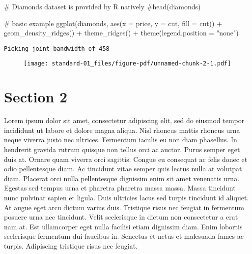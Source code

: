\documentclass[
  letterpaper,
  DIV=11,
  numbers=noendperiod,
  oneside]{scrreprt}
\newenvironment{Shaded}{\begin{snugshade}}{\end{snugshade}}
\newcommand{\AttributeTok}[1]{\textcolor[rgb]{0.40,0.45,0.13}{#1}}
\newcommand{\CommentTok}[1]{\textcolor[rgb]{0.37,0.37,0.37}{#1}}
\newcommand{\FunctionTok}[1]{\textcolor[rgb]{0.28,0.35,0.67}{#1}}
\newcommand{\NormalTok}[1]{\textcolor[rgb]{0.00,0.23,0.31}{#1}}
\newcommand{\SpecialCharTok}[1]{\textcolor[rgb]{0.37,0.37,0.37}{#1}}
\newcommand{\StringTok}[1]{\textcolor[rgb]{0.13,0.47,0.30}{#1}}
\begin{document}
\begin{Shaded}
\begin{Highlighting}[]
\CommentTok{\# Diamonds dataset is provided by R natively}
\CommentTok{\#head(diamonds)}
 
\CommentTok{\# basic example}
\FunctionTok{ggplot}\NormalTok{(diamonds, }\FunctionTok{aes}\NormalTok{(}\AttributeTok{x =}\NormalTok{ price, }\AttributeTok{y =}\NormalTok{ cut, }\AttributeTok{fill =}\NormalTok{ cut)) }\SpecialCharTok{+}
  \FunctionTok{geom\_density\_ridges}\NormalTok{() }\SpecialCharTok{+}
  \FunctionTok{theme\_ridges}\NormalTok{() }\SpecialCharTok{+} 
  \FunctionTok{theme}\NormalTok{(}\AttributeTok{legend.position =} \StringTok{"none"}\NormalTok{)}
\end{Highlighting}
\end{Shaded}

\begin{verbatim}
Picking joint bandwidth of 458
\end{verbatim}

\begin{figure}[H]

{\centering \texttt{[image: standard-01\_files/figure-pdf/unnamed-chunk-2-1.pdf]}

}

\end{figure}

\hypertarget{section-2}{%
\section{Section 2}\label{section-2}}

Lorem ipsum dolor sit amet, consectetur adipiscing elit, sed do eiusmod
tempor incididunt ut labore et dolore magna aliqua. Nisl rhoncus mattis
rhoncus urna neque viverra justo nec ultrices. Fermentum iaculis eu non
diam phasellus. In hendrerit gravida rutrum quisque non tellus orci ac
auctor. Purus semper eget duis at. Ornare quam viverra orci sagittis.
Congue eu consequat ac felis donec et odio pellentesque diam. Ac
tincidunt vitae semper quis lectus nulla at volutpat diam. Placerat orci
nulla pellentesque dignissim enim sit amet venenatis urna. Egestas sed
tempus urna et pharetra pharetra massa massa. Massa tincidunt nunc
pulvinar sapien et ligula. Duis ultricies lacus sed turpis tincidunt id
aliquet. At augue eget arcu dictum varius duis. Tristique risus nec
feugiat in fermentum posuere urna nec tincidunt. Velit scelerisque in
dictum non consectetur a erat nam at. Est ullamcorper eget nulla
facilisi etiam dignissim diam. Enim lobortis scelerisque fermentum dui
faucibus in. Senectus et netus et malesuada fames ac turpis. Adipiscing
tristique risus nec feugiat.
\end{document}
